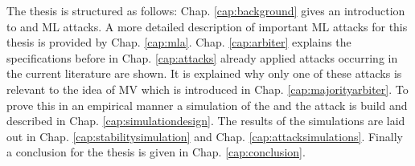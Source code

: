 The thesis is structured as follows: 
Chap. \ref{cap:background} gives an introduction to \pufs and \ac{ML} attacks.
A more detailed description of important \ac{ML} attacks for this thesis is provided by Chap. \ref{cap:mla}.
Chap. \ref{cap:arbiter} explains the \apuf specifications before in Chap. \ref{cap:attacks} already applied attacks occurring in the current literature are shown.
It is explained why only one of these attacks is relevant to the idea of \ac{MV} which is introduced in Chap. \ref{cap:majorityarbiter}. %
To prove this in an empirical manner a simulation of the \apuf and the attack is build and described in Chap. \ref{cap:simulationdesign}.
The results of the simulations are laid out in Chap. \ref{cap:stabilitysimulation} and Chap. \ref{cap:attacksimulations}.
Finally a conclusion for the thesis is given in Chap. \ref{cap:conclusion}.

